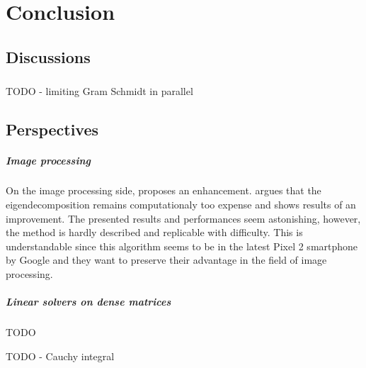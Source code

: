 \chapter{Conclusion}

\section{Discussions}

\paragraph{}
TODO - limiting Gram Schmidt in parallel

\section{Perspectives}

\paragraph{Image processing}
On the image processing side, \cite{talebi_fast_2016} proposes an enhancement.
\cite{talebi_fast_2016} argues that the eigendecomposition remains computationaly too expense and shows results of an improvement.
The presented results and performances seem astonishing, however, the method is hardly described and replicable with difficulty.
This is understandable since this algorithm seems to be in the latest Pixel 2 smartphone by Google and they want to preserve their advantage in the field of image processing.

\paragraph{Linear solvers on dense matrices}
TODO

TODO - Cauchy integral
